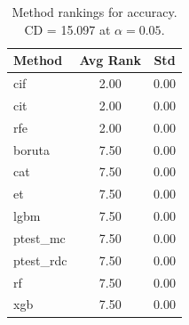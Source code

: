 \begin{table}[h]
\centering
\caption{Method rankings for accuracy. CD = 15.097 at $\alpha=0.05$.}
\label{tab:ranks_accuracy}
\begin{tabular}{lcc}
\toprule
Method & Avg Rank & Std \\
\midrule
cif & 2.00 & 0.00 \\
cit & 2.00 & 0.00 \\
rfe & 2.00 & 0.00 \\
boruta & 7.50 & 0.00 \\
cat & 7.50 & 0.00 \\
et & 7.50 & 0.00 \\
lgbm & 7.50 & 0.00 \\
ptest_mc & 7.50 & 0.00 \\
ptest_rdc & 7.50 & 0.00 \\
rf & 7.50 & 0.00 \\
xgb & 7.50 & 0.00 \\
\bottomrule
\end{tabular}
\end{table}